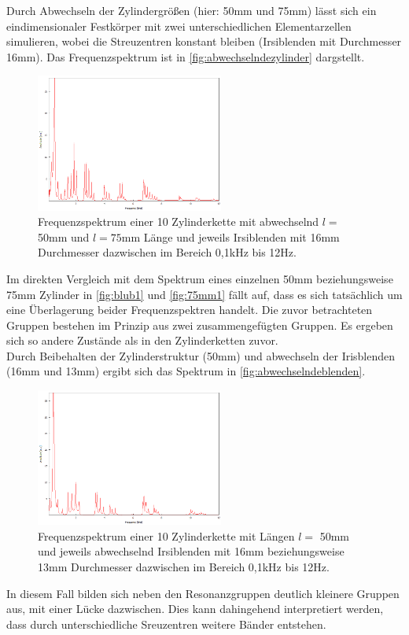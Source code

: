 Durch Abwechseln der Zylindergrößen (hier: 50\;mm und 75\;mm) lässt sich ein eindimensionaler
Festkörper mit zwei unterschiedlichen Elementarzellen simulieren, wobei die Streuzentren konstant
bleiben (Irsiblenden mit Durchmesser 16\;mm). Das Frequenzspektrum ist in \autoref{fig:abwechselndezylinder}
dargstellt.
\begin{figure}
    \centering
        \centering
        \includegraphics[width=0.55\textwidth]{data/4_4/abwechselnd.png}
    \caption{Frequenzspektrum einer 10 Zylinderkette mit abwechselnd $l = $ 50\;mm und $l = 75$\;mm Länge und jeweils Irsiblenden mit 16\;mm Durchmesser dazwischen im Bereich 0,1\;kHz bis 12\;Hz.}
    \label{fig:abwechselndezylinder}
\end{figure}
Im direkten Vergleich mit dem Spektrum eines einzelnen 50\;mm beziehungsweise 75\;mm Zylinder in 
\autoref{fig:blub1} und \autoref{fig:75mm1} fällt auf, dass es sich tatsächlich um eine Überlagerung 
beider Frequenzspektren handelt. Die zuvor betrachteten Gruppen bestehen im Prinzip aus 
zwei zusammengefügten Gruppen. Es ergeben sich so andere Zustände als in den Zylinderketten zuvor.\\
Durch Beibehalten der Zylinderstruktur (50\:mm) und abwechseln der Irisblenden (16\;mm und 13\;mm)
ergibt sich das Spektrum in \autoref{fig:abwechselndeblenden}.
\begin{figure}
    \centering
        \centering
        \includegraphics[width=0.55\textwidth]{data/4_5/abwechselndeblende.png}
    \caption{Frequenzspektrum einer 10 Zylinderkette mit Längen $l = $ 50\;mm und jeweils abwechselnd Irsiblenden mit 16\;mm beziehungsweise 13\;mm Durchmesser dazwischen im Bereich 0,1\;kHz bis 12\;Hz.}
    \label{fig:abwechselndeblenden}
\end{figure}
In diesem Fall bilden sich neben den Resonanzgruppen deutlich kleinere Gruppen aus, mit einer Lücke 
dazwischen. Dies kann dahingehend interpretiert werden, dass durch unterschiedliche Sreuzentren
weitere Bänder entstehen.